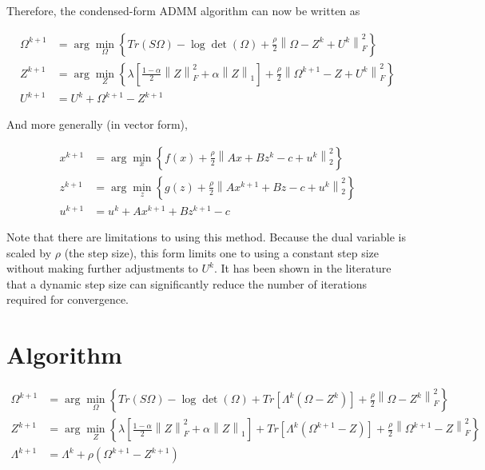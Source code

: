 \documentclass[12pt,]{book}
\theoremstyle{definition}
\theoremstyle{definition}
\theoremstyle{definition}
\theoremstyle{remark}
\begin{document}
Therefore, the condensed-form ADMM algorithm can now be written as

\begin{align}
  \Omega^{k + 1} &= \arg\min_{\Omega}\left\{ Tr\left(S\Omega\right) - \log\det\left(\Omega\right) + \frac{\rho}{2}\left\| \Omega - Z^{k} + U^{k} \right\|_{F}^{2} \right\} \\
  Z^{k + 1} &= \arg\min_{Z}\left\{ \lambda\left[ \frac{1 - \alpha}{2}\left\| Z \right\|_{F}^{2} + \alpha\left\| Z \right\|_{1} \right] + \frac{\rho}{2}\left\| \Omega^{k + 1} - Z + U^{k} \right\|_{F}^{2} \right\} \\
  U^{k + 1} &= U^{k} + \Omega^{k + 1} - Z^{k + 1}
\end{align}

And more generally (in vector form),

\begin{align}
  x^{k + 1} &= \arg\min_{x}\left\{ f(x) + \frac{\rho}{2}\left\| Ax + Bz^{k} - c + u^{k} \right\|_{2}^{2} \right\} \\
  z^{k + 1} &= \arg\min_{z}\left\{ g(z) + \frac{\rho}{2}\left\| Ax^{k + 1} + Bz - c + u^{k} \right\|_{2}^{2} \right\} \\
  u^{k + 1} &= u^{k} + Ax^{k + 1} + Bz^{k + 1} - c
\end{align}

Note that there are limitations to using this method. Because the dual
variable is scaled by \(\rho\) (the step size), this form limits one to
using a constant step size without making further adjustments to
\(U^{k}\). It has been shown in the literature that a dynamic step size
can significantly reduce the number of iterations required for
convergence.

\vspace{1cm}

\hypertarget{algorithm}{%
\section{Algorithm}\label{algorithm}}

\begin{align*}
  \Omega^{k + 1} &= \arg\min_{\Omega}\left\{ Tr\left(S\Omega\right) - \log\det\left(\Omega\right) + Tr\left[\Lambda^{k}\left(\Omega - Z^{k}\right)\right] + \frac{\rho}{2}\left\| \Omega - Z^{k} \right\|_{F}^{2} \right\} \\
  Z^{k + 1} &= \arg\min_{Z}\left\{ \lambda\left[ \frac{1 - \alpha}{2}\left\| Z \right\|_{F}^{2} + \alpha\left\| Z \right\|_{1} \right] + Tr\left[\Lambda^{k}\left(\Omega^{k + 1} - Z\right)\right] + \frac{\rho}{2}\left\| \Omega^{k + 1} - Z \right\|_{F}^{2} \right\} \\
  \Lambda^{k + 1} &= \Lambda^{k} + \rho\left( \Omega^{k + 1} - Z^{k + 1} \right)
\end{align*}
\end{document}
